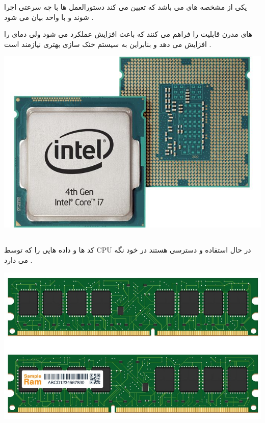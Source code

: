 \documentclass[12pt]{book}
\begin{document}
یکی از مشخصه های 
می باشد که تعیین می کند دستورالعمل ها با چه سرعتی اجرا شوند و با واحد
 بیان می شود .

های مدرن قابلیت
 را فراهم می کنند که باعث افزایش عملکرد 
می شود ولی دمای
را افزایش می دهد و بنابراین به سیستم خنک سازی بهتری نیازمند است .



\begin{center}
	\includegraphics[scale=0.4]{./DT_Haswell_i7_FB_678x452.jpg}
\end{center}


\subsection{}

کد ها و داده هایی را که توسط CPU
در حال استفاده و دسترسی هستند در خود نگه می دارد .


\begin{center}
	\includegraphics[scale=0.4]{./real-random-access-memory-or-ram-computer-vector-27187049.jpg}
\end{center}
\end{document}

